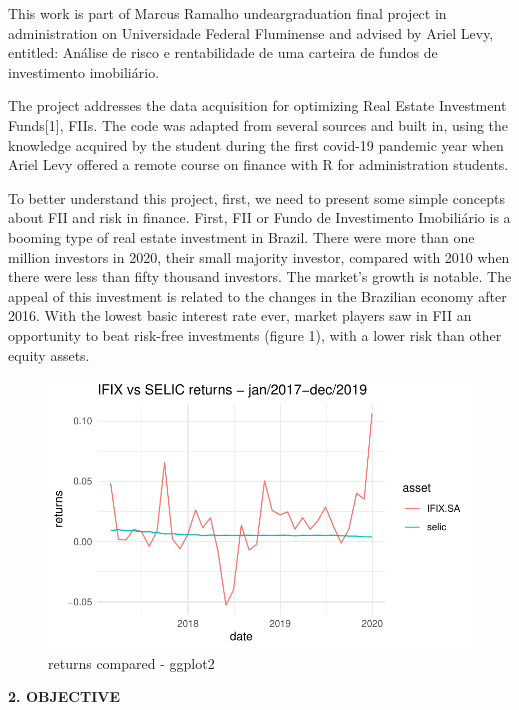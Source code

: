 \documentclass[
]{article}
\begin{document}
This work is part of Marcus Ramalho undeargraduation final project in
administration on Universidade Federal Fluminense and advised by Ariel
Levy, entitled: Análise de risco e rentabilidade de uma carteira de
fundos de investimento imobiliário.

The project addresses the data acquisition for optimizing Real Estate
Investment Funds{[}1{]}, FIIs. The code was adapted from several sources
and built in, using the knowledge acquired by the student during the
first covid-19 pandemic year when Ariel Levy offered a remote course on
finance with R for administration students.

To better understand this project, first, we need to present some simple
concepts about FII and risk in finance. First, FII or Fundo de
Investimento Imobiliário is a booming type of real estate investment in
Brazil. There were more than one million investors in 2020, their small
majority investor, compared with 2010 when there were less than fifty
thousand investors. The market's growth is notable. The appeal of this
investment is related to the changes in the Brazilian economy after
2016. With the lowest basic interest rate ever, market players saw in
FII an opportunity to beat risk-free investments (figure 1), with a
lower risk than other equity assets.

\begin{figure}

{\centering \includegraphics{FII_portfolio_opt_R_files/figure-pdf/Graph_1-1.pdf}

}

\caption{returns compared - ggplot2}

\end{figure}

\begin{center}
\textbf{2. OBJECTIVE}
\end{center}
\end{document}
